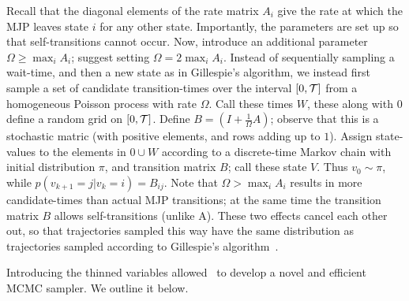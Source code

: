Recall that the diagonal elements of the rate matrix $A_i$ give the 
rate at which the MJP leaves state $i$ for any other state. Importantly,
the parameters are set up so that self-transitions cannot occur. 
Now, introduce an additional parameter $\Omega \ge \max_i A_i$;
\cite{RaoTeh13} suggest setting $\Omega = 2 \max_i A_i$. 
Instead of sequentially sampling a wait-time, and then a new state as
in Gillespie's algorithm, we instead first sample a set of candidate
transition-times over the interval $[0,{\mathcal T}]$ from a homogeneous Poisson process 
with rate $\Omega$. Call these times $W$, these along with $0$ define a
random grid on $[0,{\mathcal T}]$.
Define $B = \left(I +\frac{1}{\Omega}A\right)$; observe that this is a
stochastic matric (with positive elements, and rows adding up to $1$).
Assign state-values to the elements in $0 \cup W$ according to a discrete-time 
Markov chain with initial distribution $\pi$, and transition matrix $B$;
call these state $V$. Thus $v_0 \sim \pi$, while $p(v_{k+1}=j|v_k=i) = B_{ij}$.
Note that $\Omega > \max_i A_i$ results in more
candidate-times than actual MJP transitions; at the same time the transition
matrix $B$ allows self-transitions (unlike A). These two effects cancel
each other out, so that trajectories sampled this way
have the same distribution as trajectories
sampled according to Gillespie's algorithm~\cite{Jen1953,RaoTeh13}.

Introducing the thinned variables allowed~\cite{RaoTeh13} to develop
a novel and efficient MCMC sampler. We outline it below.

